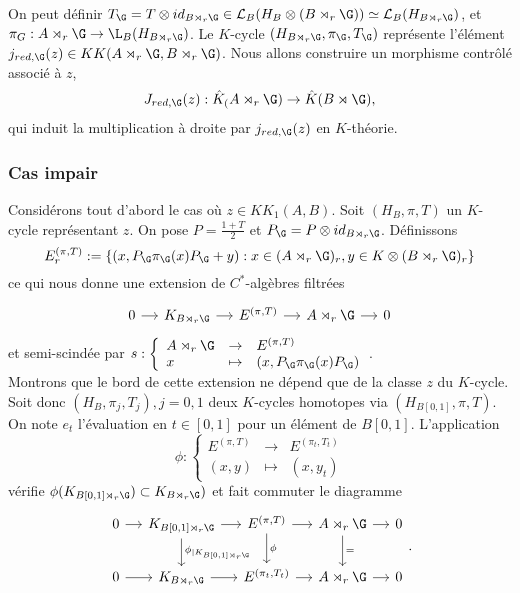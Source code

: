 On peut définir $T_\G = T\otimes id_{B\rtimes_r \G} \in \mathcal L_B(H_B\otimes (B\rtimes_r\G))\simeq \mathcal L_B(H_{B\rtimes_r \G})$, et $\pi_G : A\rtimes_r \G\rightarrow \L_B(H_{B\rtimes_r\G})$. Le $K$-cycle $(H_{B\rtimes_r \G},\pi_\G,T_\G)$ représente l'élément $j_{red,\G}(z)\in KK(A\rtimes_r \G,B\rtimes_r \G)$. Nous allons construire un morphisme contrôlé associé à $z$,  
\[J_{red,\G}(z) : \hat K_(A\rtimes_r \G)\rightarrow \hat K(B\rtimes \G),\]
qui induit la multiplication à droite par $j_{red,\G}(z)$ en $K$-théorie.\\

\subsubsection{Cas impair} Considérons tout d'abord le cas où $z\in KK_1(A,B)$. Soit $(H_B,\pi, T)$ un $K$-cycle représentant $z$. On pose $P=\frac{1+T}{2}$ et $P_\G = P\otimes id_{B\rtimes_r \G}$. Définissons
\[E^{(\pi,T)}_r :=\{(x,P_\G\pi_\G(x)P_\G+y) : x\in (A\rtimes_r \G)_r,  y\in K\otimes(B\rtimes_r \G)_r\}\]
ce qui nous donne une extension de $C^*$-algèbres filtrées
\[\begin{tikzcd}[column sep = small]
0\arrow{r} & K_{B\rtimes_r\G}\arrow{r} & E^{(\pi,T)} \arrow{r} & A\rtimes_r \G \arrow{r}& 0
\end{tikzcd}\]
et semi-scindée par $s : \left\{\begin{array}{lll}A\rtimes_r \G & \rightarrow & E^{(\pi,T)} \\ x & \mapsto & (x, P_\G \pi_\G(x)P_\G)\end{array}\right.$.\\

Montrons que le bord de cette extension ne dépend que de la classe $z$ du $K$-cycle. Soit donc $(H_B, \pi_j,T_j), j=0,1$ deux $K$-cycles homotopes via $(H_{B[0,1]},\pi,T)$. On note $e_t$ l'évaluation en $t\in[0,1]$ pour un élément de $B[0,1]$. L'application  
\[\phi : \left\{\begin{array}{lll}E^{(\pi,T)} & \rightarrow & E^{(\pi_t,T_t)} \\ (x,y) & \mapsto & (x, y_t)\end{array}\right.\]
vérifie $\phi(K_{B[0,1] \rtimes_r \G})\subset K_{B \rtimes_r \G})$ et fait commuter le diagramme
\[\begin{tikzcd}[column sep = small]
0\arrow{r} & K_{B[0,1] \rtimes_r \G}\arrow{r}\arrow{d}{\phi_{|K_{B[0,1] \rtimes_r \G}}} & E^{(\pi,T)} \arrow{r}\arrow{d}{\phi} & A\rtimes_r \G \arrow{r}\arrow{d}{=}& 0 \\
0\arrow{r} & K_{B \rtimes_r \G}\arrow{r} &  E^{(\pi_t,T_t)} \arrow{r} & A\rtimes_r \G \arrow{r} & 0
\end{tikzcd}.\]

